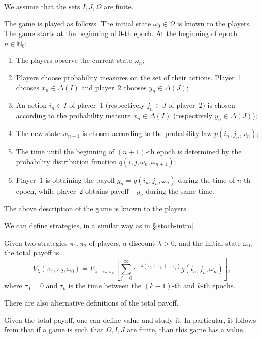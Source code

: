 \documentclass[english,openary,12pt]{article}
\theoremstyle{definition}
\newcommand{\N}{\mathbb{N}}
\begin{document}
We assume that the sets $I, J, \Omega$ are finite.

The game is played as follows. The initial state $\omega_0 \in \Omega$ is known 
to the players. The game starts at the beginning of $0$-th epoch. 
At the beginning of epoch $n \in \N_0$:
\begin{enumerate}
	\item The players observe the current state $\omega_n$;
	\item Players choose probability measures on the set of their actions. 
Player~1 chooses $x_n \in \Delta(I)$ and player~2 chooses $y_n \in \Delta(J)$;
	\item An action $i_n \in I$ of player~1 (respectively $j_n \in J$ of 
player~2) is chosen according to the probability measure $x_n \in \Delta(I)$ 
(respectively $y_n \in \Delta(J)$);
	\item The new state $w_{n+1}$ is chosen according to the probability law 
$p(i_n, j_n, \omega_n)$;
	\item The time until the beginning of $(n+1)$-th epoch is determined by the 
probability distribution function $q(i,j,\omega_n, \omega_{n+1})$;
	\item Player~1 is obtaining the payoff $g_n = g(i_n, j_n, \omega_n)$ during 
the time of $n$-th epoch, while player~2 obtains payoff $-g_n$ during the 
same time.
\end{enumerate}
The above description of the game is known to the players.

We can define strategies, in a similar way as in \S\ref{stoch-intro}.

Given two strategies $\pi_1, \pi_2$ of players, a discount $\lambda > 0$, and 
the initial state $\omega_0$, the total payoff is 
$$V_\lambda(\pi_1, \pi_2, \omega_0) = E_{\pi_1, \pi_2, \omega_0} \left[
\sum_{j=0}^\infty e^{-\lambda(\tau_0 + \tau_1 + \ldots \tau_j)} 
g(i_n, j_n, \omega_n)\right],$$
where $\tau_0 = 0$ and $\tau_k$ is the time between the $(k - 1)$-th and 
$k$-th epochs. 

There are also alternative definitions of the total payoff. 

Given the total payoff, one can define value and study it. In particular, it 
follows from \cite[Theorem 3.1]{LalSin92} that if a game is such that 
$\Omega, I, J$ are finite, than this game has a value.
\fi

\iffalse
\end{document}

